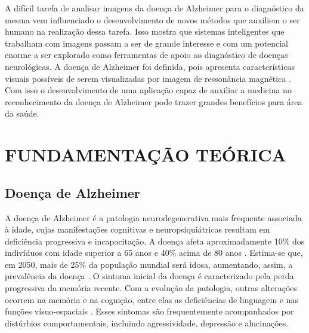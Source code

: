 \documentclass[openright]{UFRGS} %
\begin{document}
A difícil tarefa de analisar imagens da doença de  Alzheimer para o diagnóstico da mesma vem influenciado o desenvolvimento de novos métodos que auxiliem o ser humano na realização dessa tarefa.  Isso mostra que sistemas inteligentes que trabalham com imagens passam a ser de grande interesse e com um potencial enorme a ser explorado como ferramentas de apoio ao diagnóstico de doenças neurológicas.  A doença de  Alzheimer foi definida, pois apresenta características visuais possíveis de serem visualizadas por imagem de ressonância magnética . Com isso o desenvolvimento de uma aplicação  capaz de auxiliar a medicina  no reconhecimento da doença  de Alzheimer  pode trazer grandes benefícios para área da saúde.  

\chapter{FUNDAMENTAÇÃO TEÓRICA} 


\section{Doença de Alzheimer}

A doença de Alzheimer é a patologia neurodegenerativa mais frequente associada à idade, cujas manifestações cognitivas e neuropsiquiátricas resultam em deficiência progressiva e incapacitação. A doença afeta aproximadamente 10\% dos indivíduos com idade superior a 65 anos e 40\% acima de 80 anos \cite{sereniki2008doencca}. Estima-se que, em 2050, mais de 25\% da população mundial será idosa, aumentando, assim, a prevalência da doença \cite{sereniki2008doencca}. O sintoma inicial da doença é caracterizado pela perda progressiva da memória recente. Com a evolução da patologia, outras alterações ocorrem na memória e na cognição, entre elas as deficiências de linguagem e nas funções vísuo-espaciais \cite{forlenza2005tratamento}. Esses sintomas são frequentemente acompanhados por distúrbios comportamentais, incluindo agressividade, depressão e alucinações. 
\end{document}
